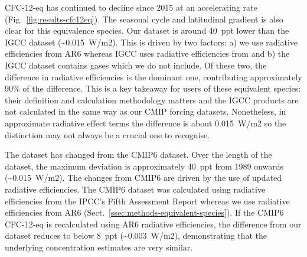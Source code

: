 CFC-12-eq has continued to decline since 2015 at an accelerating rate (Fig.~\ref{fig:results-cfc12eq}).
The seasonal cycle and latitudinal gradient is also clear for this equivalence species.
Our dataset is around 40~ppt lower than the IGCC dataset (\textasciitilde{}0.015~W/m2).
This is driven by two factors: a) we use radiative efficiencies from AR6 \citep{IPCC_AR6-WG1-Ch-7-SM_2021}
whereas IGCC uses radiative efficiencies from \citet{hodnebrog_gwps-efficiencies_2020}
and b) the IGCC dataset contains gases which we do not include.
Of these two, the difference in radiative efficiencies is the dominant one,
contributing approximately 90\% of the difference.
This is a key takeaway for users of these equivalent species:
their definition and calculation methodology matters
and the IGCC products are not calculated in the same way as our CMIP forcing datasets.
Nonetheless, in approximate radiative effect terms the difference is about 0.015~W/m2
so the distinction may not always be a crucial one to recognise.

The dataset has changed from the CMIP6 dataset.
Over the length of the dataset, the maximum deviation is approximately 40~ppt from 1989 onwards (\textasciitilde{}0.015~W/m2).
The changes from CMIP6 are driven by the use of updated radiative efficiencies.
The CMIP6 dataset was calculated using radiative efficiencies from the IPCC's Fifth Assessment Report \citep[AR5, Appendix 8.A of][]{IPCC_AR5-WG1-Ch-8_2013}
whereas we use radiative efficiencies from AR6 (Sect.~\ref{ssec:methods-equivalent-species}).
If the CMIP6 CFC-12-eq is recalculated using AR6 radiative efficiencies,
the difference from our dataset reduces to below 8~ppt (\textasciitilde{}0.003~W/m2),
demonstrating that the underlying concentration estimates are very similar.

